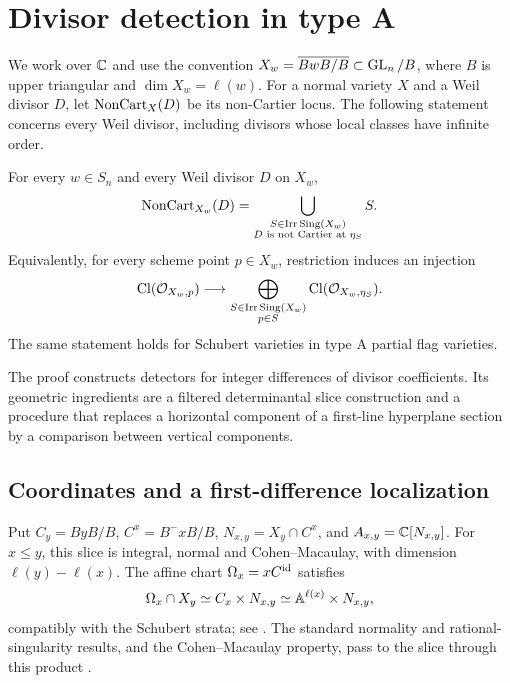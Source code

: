 \section{Divisor detection in type A}\label{sec:type_a}

We work over $\mathbb C$ and use the convention $X_w=\overline{BwB/B}\subset
\operatorname{GL}_n/B$, where $B$ is upper triangular and $\dim X_w=\ell(w)$. For a
normal variety $X$ and a Weil divisor $D$, let $\operatorname{NonCart}_X(D)$ be its
non-Cartier locus. The following statement concerns every Weil divisor,
including divisors whose local classes have infinite order.

\begin{theorem}\label{ta:main}
For every $w\in S_n$ and every Weil divisor $D$ on $X_w$,
\begin{equation}\label{ta:eq:locus}
 \operatorname{NonCart}_{X_w}(D)=
 \bigcup_{\substack{S\in\operatorname{Irr}\operatorname{Sing}(X_w)\\
                   D\text{ is not Cartier at }\eta_S}}S.
\end{equation}
Equivalently, for every scheme point $p\in X_w$, restriction induces an
injection
\begin{equation}\label{ta:eq:local_injection}
 \operatorname{Cl}(\mathcal O_{X_w,p})\longrightarrow
 \bigoplus_{\substack{S\in\operatorname{Irr}\operatorname{Sing}(X_w)\\p\in S}}
 \operatorname{Cl}(\mathcal O_{X_w,\eta_S}).
\end{equation}
The same statement holds for Schubert varieties in type A partial flag
varieties.
\end{theorem}

The proof constructs detectors for integer differences of divisor
coefficients. Its geometric ingredients are a filtered determinantal
slice construction and a procedure that replaces a horizontal component
of a first-line hyperplane section by a comparison between vertical
components.

\subsection{Coordinates and a first-difference localization}

Put $C_y=ByB/B$, $C^x=B^-xB/B$, $N_{x,y}=X_y\cap C^x$, and
$A_{x,y}=\mathbb C[N_{x,y}]$. For $x\leq y$, this slice is integral, normal and
Cohen--Macaulay, with dimension $\ell(y)-\ell(x)$.
The affine chart $\Omega_x=xC^{\operatorname{id}}$ satisfies
\[
 \Omega_x\cap X_y\simeq C_x\times N_{x,y}
 \simeq\mathbb A^{\ell(x)}\times N_{x,y},
\]
compatibly with the Schubert strata; see
\cite[Section 3 and Lemma 3.2]{WY08}. The standard normality and rational-singularity results,
and the Cohen--Macaulay property, pass to the slice through this product
\cite[Theorems 2.1.1, 2.2.3 and Proposition 2.2.5]{Bri05}.

